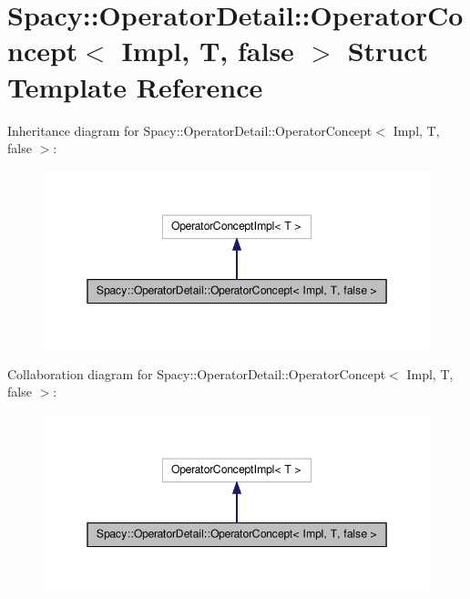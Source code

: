 \hypertarget{structSpacy_1_1OperatorDetail_1_1OperatorConcept_3_01Impl_00_01T_00_01false_01_4}{\section{\-Spacy\-:\-:\-Operator\-Detail\-:\-:\-Operator\-Concept$<$ \-Impl, \-T, false $>$ \-Struct \-Template \-Reference}
\label{structSpacy_1_1OperatorDetail_1_1OperatorConcept_3_01Impl_00_01T_00_01false_01_4}
}


\-Inheritance diagram for \-Spacy\-:\-:\-Operator\-Detail\-:\-:\-Operator\-Concept$<$ \-Impl, \-T, false $>$\-:
\nopagebreak
\begin{figure}[H]
\begin{center}
\leavevmode
\includegraphics[width=348pt]{structSpacy_1_1OperatorDetail_1_1OperatorConcept_3_01Impl_00_01T_00_01false_01_4__inherit__graph}
\end{center}
\end{figure}


\-Collaboration diagram for \-Spacy\-:\-:\-Operator\-Detail\-:\-:\-Operator\-Concept$<$ \-Impl, \-T, false $>$\-:
\nopagebreak
\begin{figure}[H]
\begin{center}
\leavevmode
\includegraphics[width=348pt]{structSpacy_1_1OperatorDetail_1_1OperatorConcept_3_01Impl_00_01T_00_01false_01_4__coll__graph}
\end{center}
\end{figure}
